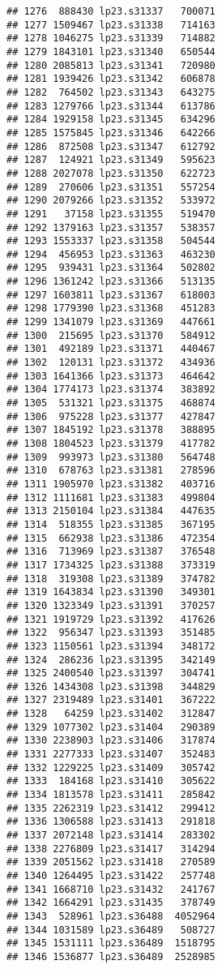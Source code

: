 \documentclass[
]{article}
\begin{document}
\begin{verbatim}
## 1276  888430 lp23.s31337   700071
## 1277 1509467 lp23.s31338   714163
## 1278 1046275 lp23.s31339   714882
## 1279 1843101 lp23.s31340   650544
## 1280 2085813 lp23.s31341   720980
## 1281 1939426 lp23.s31342   606878
## 1282  764502 lp23.s31343   643275
## 1283 1279766 lp23.s31344   613786
## 1284 1929158 lp23.s31345   634296
## 1285 1575845 lp23.s31346   642266
## 1286  872508 lp23.s31347   612792
## 1287  124921 lp23.s31349   595623
## 1288 2027078 lp23.s31350   622723
## 1289  270606 lp23.s31351   557254
## 1290 2079266 lp23.s31352   533972
## 1291   37158 lp23.s31355   519470
## 1292 1379163 lp23.s31357   538357
## 1293 1553337 lp23.s31358   504544
## 1294  456953 lp23.s31363   463230
## 1295  939431 lp23.s31364   502802
## 1296 1361242 lp23.s31366   513135
## 1297 1603811 lp23.s31367   618003
## 1298 1779390 lp23.s31368   451283
## 1299 1341079 lp23.s31369   447661
## 1300  215695 lp23.s31370   584912
## 1301  492189 lp23.s31371   440467
## 1302  120131 lp23.s31372   434936
## 1303 1641366 lp23.s31373   464642
## 1304 1774173 lp23.s31374   383892
## 1305  531321 lp23.s31375   468874
## 1306  975228 lp23.s31377   427847
## 1307 1845192 lp23.s31378   388895
## 1308 1804523 lp23.s31379   417782
## 1309  993973 lp23.s31380   564748
## 1310  678763 lp23.s31381   278596
## 1311 1905970 lp23.s31382   403716
## 1312 1111681 lp23.s31383   499804
## 1313 2150104 lp23.s31384   447635
## 1314  518355 lp23.s31385   367195
## 1315  662938 lp23.s31386   472354
## 1316  713969 lp23.s31387   376548
## 1317 1734325 lp23.s31388   373319
## 1318  319308 lp23.s31389   374782
## 1319 1643834 lp23.s31390   349301
## 1320 1323349 lp23.s31391   370257
## 1321 1919729 lp23.s31392   417626
## 1322  956347 lp23.s31393   351485
## 1323 1150561 lp23.s31394   348172
## 1324  286236 lp23.s31395   342149
## 1325 2400540 lp23.s31397   304741
## 1326 1434308 lp23.s31398   344829
## 1327 2319489 lp23.s31401   367222
## 1328   64259 lp23.s31402   312847
## 1329 1077302 lp23.s31404   290389
## 1330 2238903 lp23.s31406   317874
## 1331 2277333 lp23.s31407   352483
## 1332 1229225 lp23.s31409   305742
## 1333  184168 lp23.s31410   305622
## 1334 1813578 lp23.s31411   285842
## 1335 2262319 lp23.s31412   299412
## 1336 1306588 lp23.s31413   291818
## 1337 2072148 lp23.s31414   283302
## 1338 2276809 lp23.s31417   314294
## 1339 2051562 lp23.s31418   270589
## 1340 1264495 lp23.s31422   257748
## 1341 1668710 lp23.s31432   241767
## 1342 1664291 lp23.s31435   378749
## 1343  528961 lp23.s36488  4052964
## 1344 1031589 lp23.s36489   508727
## 1345 1531111 lp23.s36489  1518795
## 1346 1536877 lp23.s36489  2528985

\end{verbatim}
\end{document}
